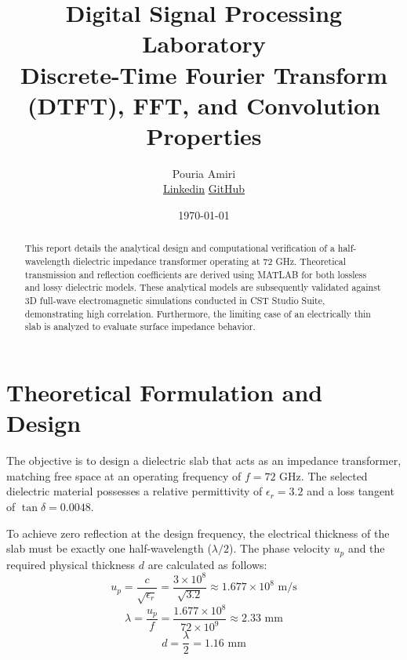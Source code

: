 \documentclass[12pt, a4paper]{article}
\title{\textbf{Digital Signal Processing Laboratory}\\ \Large Discrete-Time Fourier Transform (DTFT), FFT, and Convolution Properties}
\author{Pouria Amiri \\ \href{https://www.linkedin.com/in/pouria-amiri-9843a333a/}{Linkedin}
	\href{https://github.com/amiripouria}{GitHub}}
\date{\today}
\begin{document}
	
	\maketitle
	
	\begin{abstract}
		This report details the analytical design and computational verification of a half-wavelength dielectric impedance transformer operating at 72 GHz. Theoretical transmission and reflection coefficients are derived using MATLAB for both lossless and lossy dielectric models. These analytical models are subsequently validated against 3D full-wave electromagnetic simulations conducted in CST Studio Suite, demonstrating high correlation. Furthermore, the limiting case of an electrically thin slab is analyzed to evaluate surface impedance behavior.
	\end{abstract}
	
	\section{Theoretical Formulation and Design}
	The objective is to design a dielectric slab that acts as an impedance transformer, matching free space at an operating frequency of $f = 72\text{ GHz}$. The selected dielectric material possesses a relative permittivity of $\epsilon_r = 3.2$ and a loss tangent of $\tan \delta = 0.0048$.
	
	To achieve zero reflection at the design frequency, the electrical thickness of the slab must be exactly one half-wavelength ($\lambda/2$). The phase velocity $u_p$ and the required physical thickness $d$ are calculated as follows:
	\begin{equation}
		u_p = \frac{c}{\sqrt{\epsilon_r}} = \frac{3 \times 10^8}{\sqrt{3.2}} \approx 1.677 \times 10^8 \text{ m/s}
	\end{equation}
	\begin{equation}
		\lambda = \frac{u_p}{f} = \frac{1.677 \times 10^8}{72 \times 10^9} \approx 2.33 \text{ mm}
	\end{equation}
	\begin{equation}
		d = \frac{\lambda}{2} = 1.16 \text{ mm}
	\end{equation}
	
\end{document}
